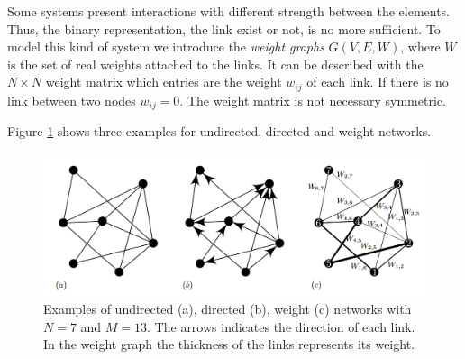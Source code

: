 Some systems present interactions with different strength between the elements. Thus, the binary representation, the link exist or not, is no more sufficient. To model this kind of system we introduce the \textit{weight graphs} $G(V,E,W)$, where $W$ is the set of real weights attached to the links.   
It can be described with the $N\times N$ weight matrix which entries are the weight $w_{ij}$ of each link. If there is no link between two nodes $w_{ij} = 0$. The weight matrix is not necessary symmetric. 

Figure \ref{fig:weight_graphs} shows three examples for undirected, directed and weight networks.
\begin{figure}[ht!]
    \centering
    \includegraphics[scale=0.45]{image/weight_graphs.png}
    \caption{Examples of undirected (a), directed (b), weight (c) networks with $N=7$ and $M=13$. The arrows indicates the direction of each link. In the weight graph the thickness of the links represents its weight.}
    \label{fig:weight_graphs}
\end{figure}





